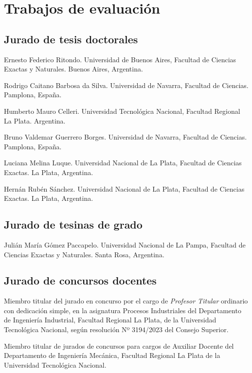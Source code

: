 \section{Trabajos de evaluación}

\subsection{Jurado de tesis doctorales}

 Ernesto Federico Ritondo. Universidad de Buenos Aires, Facultad de Ciencias Exactas y Naturales. Buenos Aires, Argentina.

 Rodrigo Caitano Barbosa da Silva. Universidad de Navarra, Facultad de Ciencias. Pamplona, España.

 Humberto Mauro Celleri. Universidad Tecnológica Nacional, Facultad Regional La Plata. Argentina.

 Bruno Valdemar Guerrero Borges. Universidad de Navarra, Facultad de Ciencias. Pamplona, España.

 Luciana Melina Luque. Universidad Nacional de La Plata, Facultad de Ciencias Exactas. La Plata, Argentina.

 Hernán Rubén Sánchez. Universidad Nacional de La Plata, Facultad de Ciencias Exactas. La Plata, Argentina.

\subsection{Jurado de tesinas de grado}

 Julián María Gómez Paccapelo. Universidad Nacional de La Pampa, Facultad de Ciencias Exactas y Naturales. Santa Rosa, Argentina.

\subsection{Jurado de concursos docentes}

 Miembro titular del jurado en concurso por el cargo de \textit{Profesor Titular} ordinario con dedicación simple, en la asignatura Procesos Industriales del Departamento de Ingeniería Industrial, Facultad Regional La Plata, de la Universidad Tecnológica Nacional, según resolución Nº 3194/2023 del Consejo Superior.

 Miembro titular de jurados de concursos para cargos de Auxiliar Docente del Departamento de Ingeniería Mecánica, Facultad Regional La Plata de la Universidad Tecnológica Nacional.

